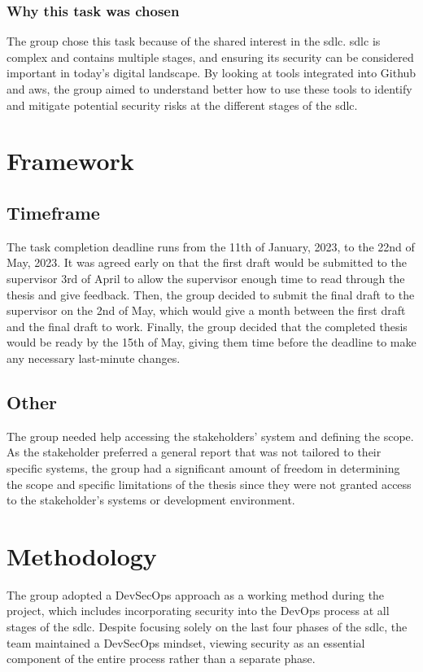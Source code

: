 \subsubsection{Why this task was chosen}
The group chose this task because of the shared interest in the \acrlong{sdlc}. \acrshort{sdlc} is complex and contains multiple stages, and ensuring its security can be considered important in today's digital landscape. By looking at tools integrated into Github and \acrshort{aws}, the group aimed to understand better how to use these tools to identify and mitigate potential security risks at the different stages of the \acrshort{sdlc}.

\section{Framework}

\subsection{Timeframe}
The task completion deadline runs from the 11th of January, 2023, to the 22nd of May, 2023. It was agreed early on that the first draft would be submitted to the supervisor 3rd of April to allow the supervisor enough time to read through the thesis and give feedback. Then, the group decided to submit the final draft to the supervisor on the 2nd of May, which would give a month between the first draft and the final draft to work. Finally, the group decided that the completed thesis would be ready by the 15th of May, giving them time before the deadline to make any necessary last-minute changes.


\subsection{Other}
The group needed help accessing the stakeholders' system and defining the scope. As the stakeholder preferred a general report that was not tailored to their specific systems, the group had a significant amount of freedom in determining the scope and specific limitations of the thesis since they were not granted access to the stakeholder's systems or development environment.

\section{Methodology}
The group adopted a DevSecOps approach as a working method during the project, which includes incorporating security into the DevOps process at all stages of the \acrshort{sdlc}. Despite focusing solely on the last four phases of the \acrshort{sdlc}, the team maintained a DevSecOps mindset, viewing security as an essential component of the entire process rather than a separate phase. 


